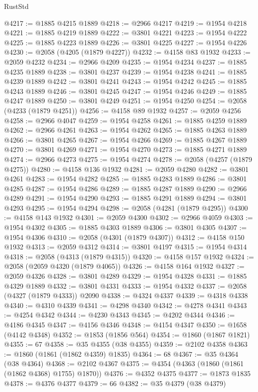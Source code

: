 \begin{lexlean}{RustStd}
\begin{coremodule}
{\begin{coremodule}
{{{{{{{{{{{{{{{{{{{{{{{{{{{{{@4217 := @1885 @4215 @1889
@4218 := @2966 @4217
@4219 := @1954 @4218
@4221 := @1885 @4219 @1889
@4222 := @3801 @4221
@4223 := @1954 @4222
@4225 := @1885 @4223 @1889
@4226 := @3801 @4225
@4227 := @1954 @4226
@4230 := @2058 (@4205 (@1879 @4227))
@4232 := @4158 @83 @1932
@4233 := @2059 @4232
@4234 := @2966 @4209
@4235 := @1954 @4234
@4237 := @1885 @4235 @1889
@4238 := @3801 @4237
@4239 := @1954 @4238
@4241 := @1885 @4239 @1889
@4242 := @3801 @4241
@4243 := @1954 @4242
@4245 := @1885 @4243 @1889
@4246 := @3801 @4245
@4247 := @1954 @4246
@4249 := @1885 @4247 @1889
@4250 := @3801 @4249
@4251 := @1954 @4250
@4254 := @2058 (@4233 (@1879 @4251))
@4256 := @4158 @89 @1932
@4257 := @2059 @4256
@4258 := @2966 @4047
@4259 := @1954 @4258
@4261 := @1885 @4259 @1889
@4262 := @2966 @4261
@4263 := @1954 @4262
@4265 := @1885 @4263 @1889
@4266 := @3801 @4265
@4267 := @1954 @4266
@4269 := @1885 @4267 @1889
@4270 := @3801 @4269
@4271 := @1954 @4270
@4273 := @1885 @4271 @1889
@4274 := @2966 @4273
@4275 := @1954 @4274
@4278 := @2058 (@4257 (@1879 @4275))
@4280 := @4158 @136 @1932
@4281 := @2059 @4280
@4282 := @3801 @4261
@4283 := @1954 @4282
@4285 := @1885 @4283 @1889
@4286 := @3801 @4285
@4287 := @1954 @4286
@4289 := @1885 @4287 @1889
@4290 := @2966 @4289
@4291 := @1954 @4290
@4293 := @1885 @4291 @1889
@4294 := @3801 @4293
@4295 := @1954 @4294
@4298 := @2058 (@4281 (@1879 @4295))
@4300 := @4158 @143 @1932
@4301 := @2059 @4300
@4302 := @2966 @4059
@4303 := @1954 @4302
@4305 := @1885 @4303 @1889
@4306 := @3801 @4305
@4307 := @1954 @4306
@4310 := @2058 (@4301 (@1879 @4307))
@4312 := @4158 @150 @1932
@4313 := @2059 @4312
@4314 := @3801 @4197
@4315 := @1954 @4314
@4318 := @2058 (@4313 (@1879 @4315))
@4320 := @4158 @157 @1932
@4324 := @2058 (@2059 @4320 (@1879 @4065))
@4326 := @4158 @164 @1932
@4327 := @2059 @4326
@4328 := @3801 @4289
@4329 := @1954 @4328
@4331 := @1885 @4329 @1889
@4332 := @3801 @4331
@4333 := @1954 @4332
@4337 := @2058 (@4327 (@1879 @4333)) @2090
@4338 := @4324 @4337
@4339 := @4318 @4338
@4340 := @4310 @4339
@4341 := @4298 @4340
@4342 := @4278 @4341
@4343 := @4254 @4342
@4344 := @4230 @4343
@4345 := @4202 @4344
@4346 := @4186 @4345
@4347 := @4156 @4346
@4348 := @4154 @4347
@4350 := @1658 (@4142 @4348)
@4352 := @1853 (@1856 @564)
@4354 := @1860 (@1867 @1821)
@4355 := 67
@4358 := @35 @4355 (@38 @4355)
@4359 := @2102 @4358
@4363 := @1860 (@1861 (@1862 @4359) @1835)
@4364 := 68
@4367 := @35 @4364 (@38 @4364)
@4368 := @2102 @4367
@4375 := @4354 (@4363 (@1860 (@1861 (@1862 @4368) @1755) @1870))
@4376 := @4352 @4375
@4377 := @1873 @1835
@4378 := @4376 @4377
@4379 := 66
@4382 := @35 @4379 (@38 @4379)
}}}}}}}}}}}}}}}}}}}}}}}}}}}}}
\end{coremodule}}
\end{coremodule}
\end{lexlean}
